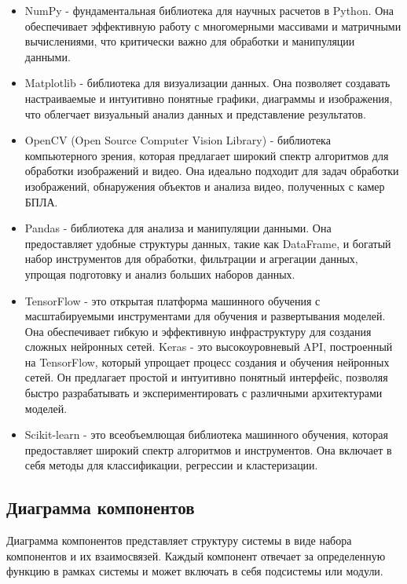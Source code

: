\begin{itemize}
\item NumPy - фундаментальная библиотека для научных расчетов в Python. Она обеспечивает эффективную работу с многомерными массивами и матричными вычислениями, что критически важно для обработки и манипуляции данными.
\item Matplotlib - библиотека для визуализации данных. Она позволяет создавать настраиваемые и интуитивно понятные графики, диаграммы и изображения, что облегчает визуальный анализ данных и представление результатов.
\item OpenCV (Open Source Computer Vision Library) - библиотека компьютерного зрения, которая предлагает широкий спектр алгоритмов для обработки изображений и видео. Она идеально подходит для задач обработки изображений, обнаружения объектов и анализа видео, полученных с камер БПЛА.
\item Pandas - библиотека для анализа и манипуляции данными. Она предоставляет удобные структуры данных, такие как DataFrame, и богатый набор инструментов для обработки, фильтрации и агрегации данных, упрощая подготовку и анализ больших наборов данных.
\item TensorFlow - это открытая платформа машинного обучения с масштабируемыми инструментами для обучения и развертывания моделей. Она обеспечивает гибкую и эффективную инфраструктуру для создания сложных нейронных сетей. Keras - это высокоуровневый API, построенный на TensorFlow, который упрощает процесс создания и обучения нейронных сетей. Он предлагает простой и интуитивно понятный интерфейс, позволяя быстро разрабатывать и экспериментировать с различными архитектурами моделей.
\item Scikit-learn - это всеобъемлющая библиотека машинного обучения, которая предоставляет широкий спектр алгоритмов и инструментов. Она включает в себя методы для классификации, регрессии и кластеризации.
\end{itemize}

\subsection{Диаграмма компонентов}

Диаграмма компонентов представляет структуру системы в виде набора компонентов и их взаимосвязей. Каждый компонент отвечает за определенную функцию в рамках системы и может включать в себя подсистемы или модули.

